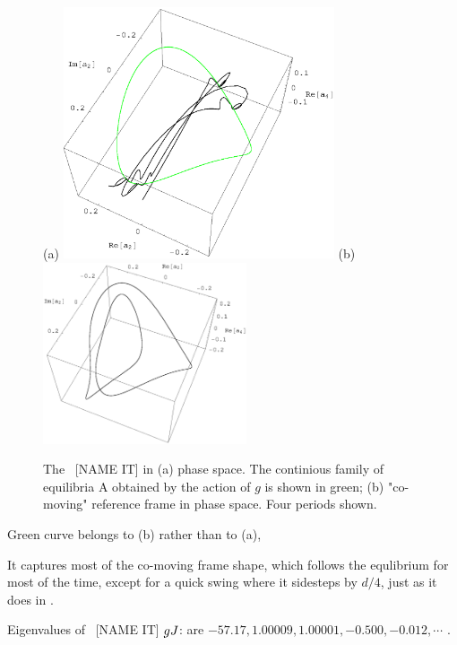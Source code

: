\begin{figure}[t] %
\centering
(a) \includegraphics[width=8.0cm]{figs/rpoEq22-55-4.eps}
\hspace{0.1in}
(b) \includegraphics[width=6.0cm]{figs/rpo22-55-4-cm.eps}
\caption{
 The \rpo\ [NAME IT] in (a) phase space. The continious family of 
	equilibria A obtained by the action of $g$ is shown in green;
 (b) "co-moving" reference frame in phase space. Four periods shown.
        }
\label{f:rpoNAMEIT}
\end{figure}

Green curve belongs to (b) %
rather than to  (a), %

It captures most of the co-moving frame {\rpo} shape, which follows the
equlibrium for most of the time, except for a quick swing where it
sidesteps by $d/4$, just as it does in . 

Eigenvalues of \rpo\ [NAME IT] $g{J}$: are
$ -57.17,  1.00009, 1.00001, -0.500, -0.012, \cdots$ .
%

